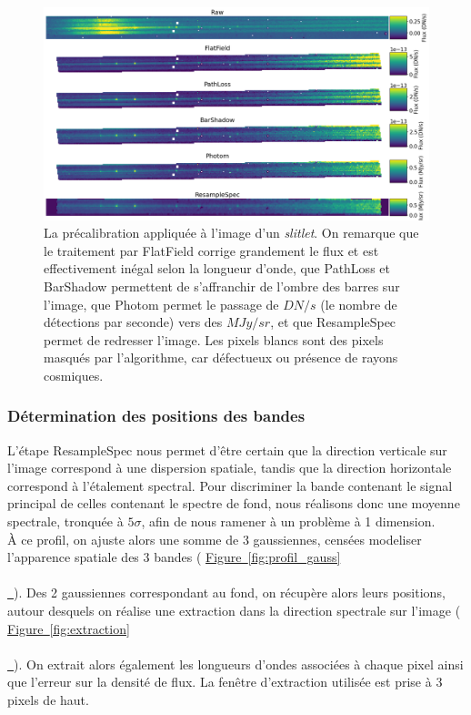 \documentclass[12pt, a4paper]{article}
\newcommand*{\figref}[2][]{%
  \hyperref[{#2}]{%
    Figure~\ref*{#2}%
    \ifx\\#1\\%
    \else
      \,#1%
    \fi
  }%
}
\begin{document}
\begin{figure}[H]
  \centering
  \includegraphics[scale=0.45]{assets/precal.png}
  \caption{La précalibration appliquée à l'image d'un \textit{slitlet}. On remarque que le traitement par FlatField corrige grandement le flux et est effectivement inégal selon la longueur d'onde, que PathLoss et BarShadow permettent de s'affranchir de l'ombre des barres sur l'image, que Photom permet le passage de $DN/s$ (le nombre de détections par seconde) vers des $MJy/sr$, et que ResampleSpec permet de redresser l'image. Les pixels blancs sont des pixels masqués par l'algorithme, car défectueux ou présence de rayons cosmiques.}
  \label{fig:precal}
\end{figure}


\subsubsection{Détermination des positions des bandes}

L'étape ResampleSpec nous permet d'être certain que la direction verticale sur l'image correspond à une dispersion spatiale, tandis que la direction horizontale correspond à l'étalement spectral. Pour discriminer la bande contenant le signal principal de celles contenant le spectre de fond, nous réalisons donc une moyenne spectrale, tronquée à $5\sigma$, afin de nous ramener à un problème à 1 dimension.\\

À ce profil, on ajuste alors une somme de 3 gaussiennes, censées modeliser l'apparence spatiale des 3 bandes (\figref{fig:profil_gauss}). Des 2 gaussiennes correspondant au fond, on récupère alors leurs positions, autour desquels on réalise une extraction dans la direction spectrale sur l'image (\figref{fig:extraction}). On extrait alors également les longueurs d'ondes associées à chaque pixel ainsi que l'erreur sur la densité de flux. La fenêtre d'extraction utilisée est prise à 3 pixels de haut.
\end{document}
